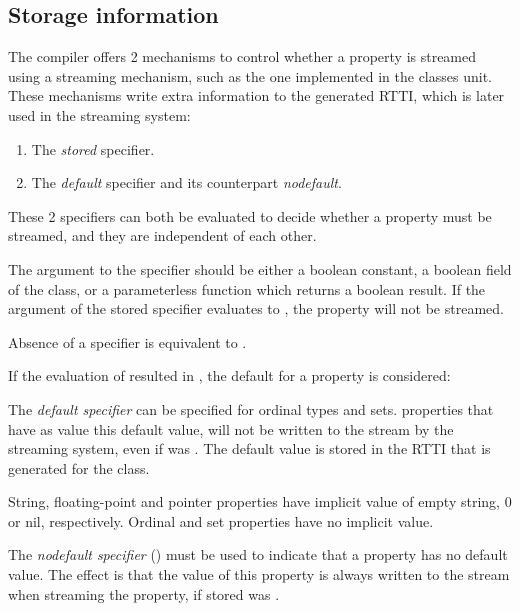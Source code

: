 \subsection{Storage information}
The compiler offers 2 mechanisms to control whether a property is streamed
using a streaming mechanism, such as the one implemented in the classes
unit. These mechanisms write extra information to the generated RTTI, which
is later used in the streaming system:

\begin{enumerate}
\item The {\em stored} specifier.
\item The {\em default} specifier and its counterpart {\em nodefault}.
\end{enumerate}
These 2 specifiers can both be evaluated to decide whether a property must be
streamed, and they are independent of each other.

The argument to the  specifier should be either a boolean constant, 
a boolean field of the class, or a parameterless function which returns a boolean
result. If the argument of the stored specifier evaluates to ,
the property will not be streamed. 

\begin{remark}
Absence of a  specifier is equivalent to .
\end{remark}

If the evaluation of  resulted in , the default for a
property is considered: 

The {\em default specifier} can be specified for ordinal types and sets.
properties that have as value this default value, will not be written to 
the stream by the streaming system, even if  was .
The default value is stored in the RTTI that is generated for the class. 

String, floating-point and pointer properties have implicit 
value of empty string, 0 or nil, respectively.
Ordinal and set properties have no implicit  value.

The {\em nodefault specifier} () must be used to indicate 
that a property has no default value. The effect is that the value of this
property is always written to the stream when streaming the property, if
stored was . 

